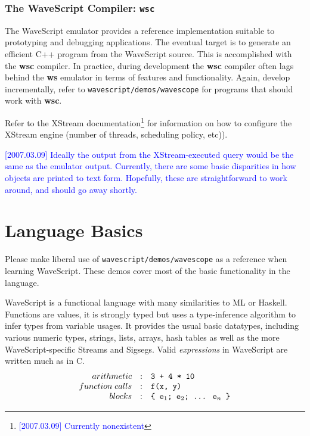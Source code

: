 \documentclass[twocolumn]{report}
\newcommand{\rednote}[1]{{\textcolor{blue}{#1}}}
\begin{document}
\subsection{The WaveScript Compiler: {\tt \bf wsc}}

The WaveScript emulator provides a reference implementation suitable
to prototyping and debugging applications.  The eventual target is to
generate an efficient C++ program from the WaveScript source.  This is
accomplished with the {\bf wsc} compiler.  In practice, during
development the {\bf wsc} compiler often lags behind the {\bf ws}
emulator in terms of features and functionality.  Again, develop
incrementally, refer to {\tt wavescript/demos/wavescope} for programs that
should work with {\bf wsc}.

Refer to the XStream documentation\footnote{\rednote{[2007.03.09] Currently nonexistent}} 
for information on how to configure the XStream engine
(number of threads, scheduling policy, etc)).

\rednote{[2007.03.09] Ideally the output from the XStream-executed
query would be the same as the emulator output.  Currently, there are
some basic disparities in how objects are printed to text form.  Hopefully, these
are straightforward to work around, and should go away shortly.}








\chapter{Language Basics}

Please make liberal use of {\tt wavescript/demos/wavescope} as a reference
when learning WaveScript.  These demos cover most of the basic
functionality in the language.


WaveScript is a functional language with many similarities to ML or
Haskell.  Functions are values, it is strongly typed but uses a
type-inference algorithm to infer types from variable usages.
It provides the usual basic datatypes, including various
numeric types, strings, lists, arrays, hash tables as well as the more
WaveScript-specific Streams and Sigsegs.  Valid {\em expressions} in
WaveScript are written much as in C.
\[
\begin{array}{rcl}
arithmetic       & : & $\tt 3 + 4 * 10 $  \\
function\; calls & : & $\tt f(x, y)$  \\
blocks           & : & $\tt \{ e$_1$; e$_2$; \ldots$\:$ e$_n$ \}$  \\
\end{array}
\]
\end{document}
